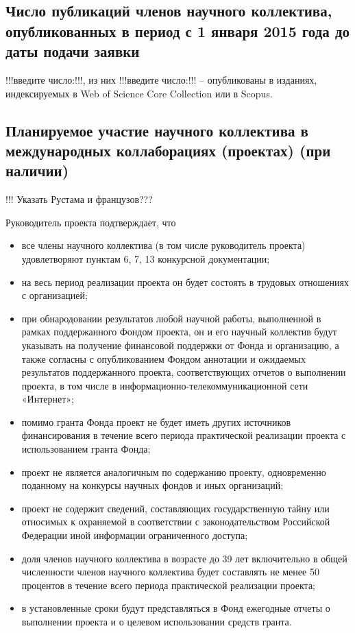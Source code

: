 \documentclass[12pt]{article}  %
\theoremstyle{remark}
\begin{document}
\subsection{Число публикаций членов научного коллектива, опубликованных в период с 1 января 2015 года до даты подачи заявки}

!!!введите число:!!!, из них !!!введите число:!!! – опубликованы в изданиях, индексируемых в Web of Science Core Collection или в Scopus.

\subsection{Планируемое участие научного коллектива в международных коллаборациях (проектах) (при наличии)}
!!! Указать Рустама и французов???

\vline
Руководитель проекта подтверждает, что
\begin{itemize}
\item все члены научного коллектива (в том числе руководитель проекта) удовлетворяют пунктам 6, 7, 13 конкурсной документации;
\item на весь период реализации проекта он будет состоять в трудовых отношениях с организацией;
\item при обнародовании результатов любой научной работы, выполненной в рамках поддержанного Фондом проекта, он и его научный коллектив будут указывать на получение финансовой поддержки от Фонда и организацию, а также согласны с опубликованием Фондом аннотации и ожидаемых результатов поддержанного проекта, соответствующих отчетов о выполнении проекта, в том числе в информационно-телекоммуникационной сети «Интернет»;
\item помимо гранта Фонда проект не будет иметь других источников финансирования в течение всего периода практической реализации проекта с использованием гранта Фонда;
\item проект не является аналогичным по содержанию проекту, одновременно поданному на конкурсы научных фондов и иных организаций;
\item проект не содержит сведений, составляющих государственную тайну или относимых к охраняемой в соответствии с законодательством Российской Федерации иной информации ограниченного доступа;
\item доля членов научного коллектива в возрасте до 39 лет включительно в общей численности членов научного коллектива будет составлять не менее 50 процентов в течение всего периода практической реализации проекта;
\item в установленные сроки будут представляться в Фонд ежегодные отчеты о выполнении проекта и о целевом использовании средств гранта.
\end{itemize}
\end{document}
